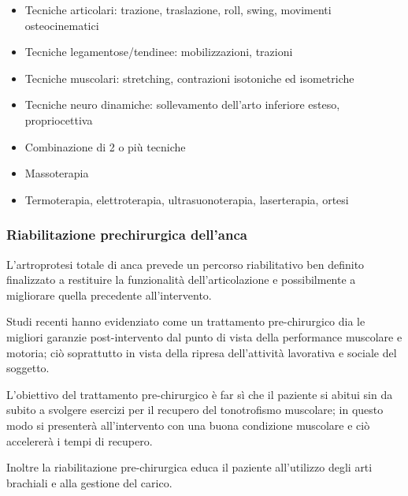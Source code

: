 \begin{itemize}
\item Tecniche articolari: trazione, traslazione, roll, swing, movimenti osteocinematici
\item Tecniche legamentose/tendinee: mobilizzazioni, trazioni
\item Tecniche muscolari: stretching, contrazioni isotoniche ed isometriche
\item Tecniche neuro dinamiche: sollevamento dell'arto inferiore esteso, propriocettiva
\item Combinazione di 2 o più tecniche
\item Massoterapia
\item Termoterapia, elettroterapia, ultrasuonoterapia, laserterapia, ortesi
\end{itemize}

\subsubsection{Riabilitazione prechirurgica dell'anca}

L'artroprotesi totale di anca prevede un percorso riabilitativo ben definito finalizzato a restituire la funzionalità dell'articolazione e possibilmente a migliorare quella precedente all'intervento.

Studi recenti hanno evidenziato come un trattamento pre-chirurgico dia le migliori garanzie post-intervento dal punto di vista della performance muscolare e motoria; ciò soprattutto in vista della ripresa dell'attività lavorativa e sociale del soggetto.

L'obiettivo del trattamento pre-chirurgico è far sì che il paziente si abitui sin da subito a svolgere esercizi per il recupero del tonotrofismo muscolare; in questo modo si presenterà all'intervento con una buona condizione muscolare e ciò accelererà i tempi di recupero.

Inoltre la riabilitazione pre-chirurgica educa il paziente all'utilizzo degli arti brachiali e alla gestione del carico.

